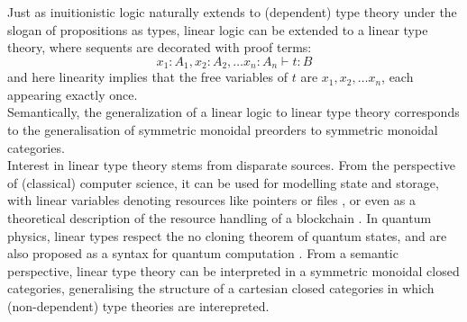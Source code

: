 Just as inuitionistic logic naturally extends to (dependent) type theory under the slogan of propositions as types, linear logic can be extended to a linear type theory, where sequents are decorated with proof terms:
\[
  x_1 : A_1, x_2 : A_2, \dots x_n : A_n \vdash t : B
\]
and here linearity implies that the free variables of $t$ are $x_1, x_2, \dots x_n$, each appearing exactly once.\\
Semantically, the generalization of a linear logic to linear type theory corresponds to the generalisation of symmetric monoidal preorders to symmetric monoidal categories.\\
Interest in linear type theory stems from disparate sources. From the perspective of (classical) computer science, it can be used for modelling state and storage, with linear variables denoting resources like pointers or files \cite{krishnaswami}, or even as a theoretical description of the resource handling of a blockchain \cite{meredith2015linear}. In quantum physics, linear types respect the no cloning theorem of quantum states, and are also proposed as a syntax for quantum computation \cite{duncan2006types}. From a semantic perspective, linear type theory can be interpreted in a symmetric monoidal closed categories, generalising the structure of a cartesian closed categories in which (non-dependent) type theories are interepreted.\\


